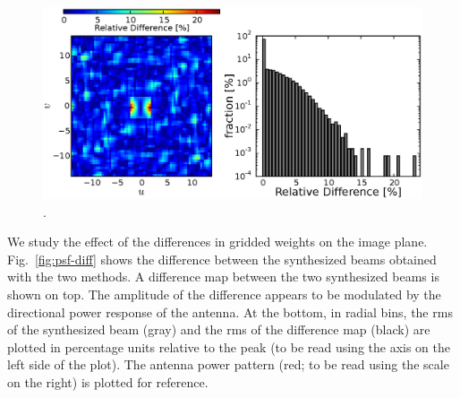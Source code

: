 \documentclass[a4paper,fleqn,usenatbib]{mnras}
\begin{document}
\begin{figure}
  \includegraphics[width=\columnwidth]{figure7}
  \caption{.}
  \label{fig:MOFF-FX-uvwts}
\end{figure}

We study the effect of the differences in gridded weights on the image plane. 
Fig.~\ref{fig:psf-diff} shows the difference between the synthesized beams 
obtained with the two methods. A difference map between the two synthesized 
beams is shown on top. The amplitude of the difference appears to be 
modulated by the directional power response of the antenna. At the bottom, 
in radial bins, the rms of the synthesized beam (gray) and the rms of the 
difference map (black) are plotted in percentage units relative to the peak 
(to be read using the axis on the left side of the plot). The antenna power 
pattern (red; to be read using the scale on the right) is plotted for reference. 
\end{document}
